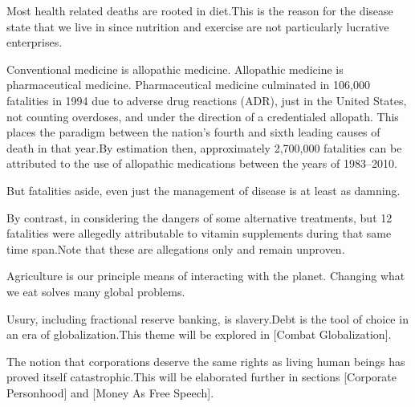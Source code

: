 Most health related deaths are rooted in diet. This is the reason for the disease state that we live in since nutrition and exercise are not particularly lucrative enterprises.


Conventional medicine is allopathic medicine. Allopathic medicine is pharmaceutical medicine. Pharmaceutical medicine culminated in 106,000 fatalities in 1994 due to adverse drug reactions (ADR), just in the United States, not counting overdoses, and under the direction of a credentialed allopath. This places the paradigm between the nation's fourth and sixth leading causes of death in that year. By estimation then, approximately 2,700,000 fatalities can be attributed to the use of allopathic medications between the years of 1983--2010. 

But fatalities aside, even just the management of disease is at least as damning.\footnotecite[leape2000]

By contrast, in considering the dangers of some alternative treatments, but 12 fatalities were allegedly attributable to vitamin supplements during that same time span. Note that these are allegations only and remain unproven.


Agriculture is our principle means of interacting with the planet. Changing what we eat solves many global problems.


Usury, including fractional reserve banking, is slavery. Debt is the tool of choice in an era of globalization.\footnotecite[perkins2005] This theme will be explored in [Combat Globalization].


The notion that corporations deserve the same rights as living human beings has proved itself catastrophic. This will be elaborated further in sections \in{}[Corporate Personhood] and \in{}[Money As Free Speech].

